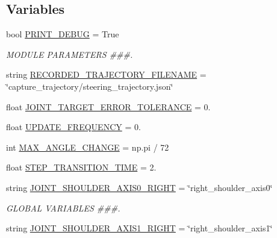 \subsection*{Variables}
\begin{DoxyCompactItemize}
\item 
bool \mbox{\hyperlink{namespacesteering__simulation_a13db823567e2a46183a6887d72165d65}{P\+R\+I\+N\+T\+\_\+\+D\+E\+B\+UG}} = True
\begin{DoxyCompactList}\small\item\em M\+O\+D\+U\+LE P\+A\+R\+A\+M\+E\+T\+E\+RS \#\#\#. \end{DoxyCompactList}\item 
string \mbox{\hyperlink{namespacesteering__simulation_ab4de54bdf1b917546004a6eb92a8cd27}{R\+E\+C\+O\+R\+D\+E\+D\+\_\+\+T\+R\+A\+J\+E\+C\+T\+O\+R\+Y\+\_\+\+F\+I\+L\+E\+N\+A\+ME}} = \char`\"{}capture\+\_\+trajectory/steering\+\_\+trajectory.\+json\char`\"{}
\item 
float \mbox{\hyperlink{namespacesteering__simulation_a9d7ce571547e355ac4b1794548af1682}{J\+O\+I\+N\+T\+\_\+\+T\+A\+R\+G\+E\+T\+\_\+\+E\+R\+R\+O\+R\+\_\+\+T\+O\+L\+E\+R\+A\+N\+CE}} = 0.
\item 
float \mbox{\hyperlink{namespacesteering__simulation_aa98f000080f13c942c2287914f8ef406}{U\+P\+D\+A\+T\+E\+\_\+\+F\+R\+E\+Q\+U\+E\+N\+CY}} = 0.
\item 
int \mbox{\hyperlink{namespacesteering__simulation_af6a6a70049e66b65e195d32a0e566f39}{M\+A\+X\+\_\+\+A\+N\+G\+L\+E\+\_\+\+C\+H\+A\+N\+GE}} = np.\+pi / 72
\item 
float \mbox{\hyperlink{namespacesteering__simulation_a4f4712994f92a7c212a9fc29f90efafd}{S\+T\+E\+P\+\_\+\+T\+R\+A\+N\+S\+I\+T\+I\+O\+N\+\_\+\+T\+I\+ME}} = 2.
\item 
string \mbox{\hyperlink{namespacesteering__simulation_aa17ebfc23242a5eb70e77d1c7b838b41}{J\+O\+I\+N\+T\+\_\+\+S\+H\+O\+U\+L\+D\+E\+R\+\_\+\+A\+X\+I\+S0\+\_\+\+R\+I\+G\+HT}} = \char`\"{}right\+\_\+shoulder\+\_\+axis0\char`\"{}
\begin{DoxyCompactList}\small\item\em G\+L\+O\+B\+AL V\+A\+R\+I\+A\+B\+L\+ES \#\#\#. \end{DoxyCompactList}\item 
string \mbox{\hyperlink{namespacesteering__simulation_a30fbab19241dfbe329ee608a9c47a31b}{J\+O\+I\+N\+T\+\_\+\+S\+H\+O\+U\+L\+D\+E\+R\+\_\+\+A\+X\+I\+S1\+\_\+\+R\+I\+G\+HT}} = \char`\"{}right\+\_\+shoulder\+\_\+axis1\char`\"{}
\item 

\end{DoxyCompactItemize}
